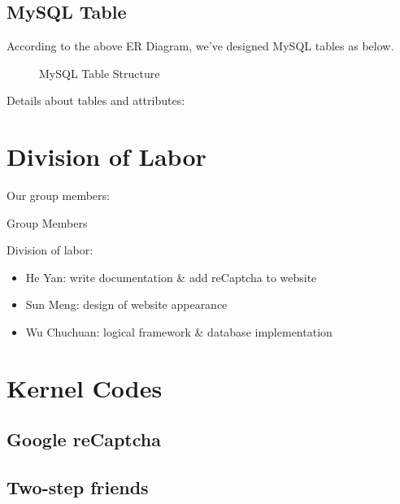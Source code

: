 \subsection{MySQL Table}

According to the above ER Diagram, we've designed MySQL tables as below.

\begin{figure}[htbp]
\begin{center}

\end{center}
\caption{MySQL Table Structure}
\end{figure}

Details about tables and attributes:



\section{Division of Labor}

Our group members:

\begin{table}[htbp]
	\begin{center}
		
	\end{center}
	\caption{Group Members}
\end{table}

Division of labor:

\begin{itemize}
	\item He Yan: write documentation \& add reCaptcha to website
	\item Sun Meng: design of website appearance
	\item Wu Chuchuan: logical framework \& database implementation
\end{itemize}

\section{Kernel Codes}

\subsection{Google reCaptcha}


\subsection{Two-step friends}
% 

